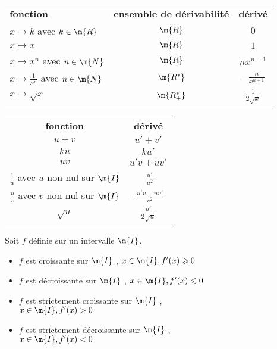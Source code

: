 \begin{center}
    \begin{tabular}{l | c | c}

        \textbf{fonction} &  \textbf{ensemble de dérivabilité} & \textbf{dérivé}\\
        $x \mapsto k$ avec $k\in\m{R}$ 
        & $\m{R}$ 
        & $0$ \\
        $x \mapsto x$ 
        & $\m{R}$ 
        & $1$ \\
        $x \mapsto x^n$ avec $n\in\m{N}$
        & $\m{R}$ 
        & $nx^{n-1}$ \\
        $x \mapsto \frac{1}{x^n}$ avec $n\in\m{N}$
        & $\m{R^*}$ 
        & $-\frac{n}{x^{n+1}}$ \\
        $x \mapsto \sqrt{x}$
        & $\m{R_+^*}$ 
        & $\frac{1}{2\sqrt{x}}$ \\
    \end{tabular}
\end{center}


\begin{center}
    \begin{tabular}{c | c}
        \textbf{fonction} & \textbf{dérivé}\\
        $u+v$ & $u'+v'$\\
        $ku$ & $ku'$\\
        $uv$ & $u'v+uv'$\\
        $\frac{1}{u}$ avec $u$ non nul sur $\m{I}$ & -$\frac{u'}{u^2}$\\
        $\frac{u}{v}$ avec $v$ non nul sur $\m{I}$ & -$\frac{u'v-uv'}{v^2}$\\
        $\sqrt{u}$ & $\frac{u'}{2\sqrt{u}}$\\

    \end{tabular}
\end{center}

\thm{}
Soit $f$ définie sur un intervalle $\m{I}$.
\begin{itemize}
    \item $f$ est croissante sur $\m{I}$ \ssi,
    \pt{} $x\in\m{I}, f'(x) \geqslant 0$
    \item $f$ est décroissante sur $\m{I}$ \ssi,
    \pt{} $x\in\m{I}, f'(x) \leqslant 0$
    \item $f$ est strictement croissante sur $\m{I}$ \ssi,\\
    \pt{} $x\in\m{I}, f'(x) > 0$
    \item $f$ est strictement décroissante sur $\m{I}$ \ssi,\\
    \pt{} $x\in\m{I}, f'(x) < 0$
\end{itemize}












